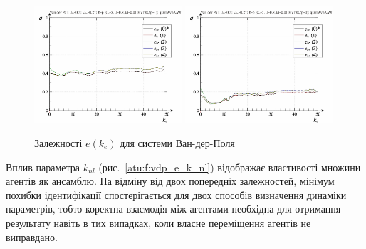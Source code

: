 \begin{figure}[ht!]
\begin{center}
  \includegraphics[width=0.49\textwidth]{p/cha/vdp/vdp_id-p_k_e_sign.png}
  \hfill
  \includegraphics[width=0.49\textwidth]{p/cha/vdp/vdp_id-p_k_e_sin.png}
\end{center}
  \caption{Залежності $\bar{e}(k_e)$ для системи Ван-дер-Поля}
\label{atu:f:vdp_e_k_e}
\end{figure}

Вплив параметра
$ k_{nl} $ (рис.~\ref{atu:f:vdp_e_k_nl}) відображає властивості множини агентів
як ансамблю. На відміну від двох попередніх залежностей, мінімум
похибки ідентифікації спостерігається для двох способів
визначення динаміки параметрів, тобто коректна взаємодія
між агентами необхідна для отримання результату навіть в тих
випадках, коли власне переміщення агентів не виправдано.

